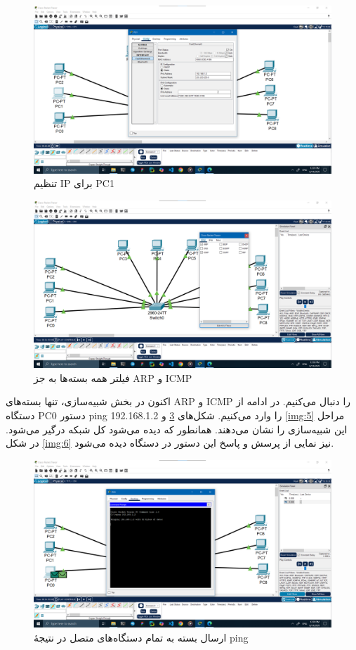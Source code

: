 \documentclass[12pt]{article}
\begin{document}
	\begin{figure}[H]
		\centering
		\includegraphics[width=\textwidth]{resources/2-1.png}
		\caption{تنظیم \textenglish{IP} برای \textenglish{PC1}}
		\label{img:2-1}
	\end{figure}
	\begin{figure}[H]
		\centering
		\includegraphics[width=\textwidth]{resources/3.png}
		\caption{فیلتر همه بسته‌ها به جز \textenglish{ARP} و \textenglish{ICMP}}
		\label{img:3}
	\end{figure}
	اکنون در بخش شبیه‌سازی، تنها بسته‌های \textenglish{ARP} و \textenglish{ICMP} را دنبال می‌کنیم. در ادامه از دستگاه \textenglish{PC0} دستور \textenglish{ping 192.168.1.2} را وارد می‌کنیم. شکل‌های \ref{img:4} و \ref{img:5} مراحل این شبیه‌سازی را نشان می‌دهند. همانطور که دیده می‌شود کل شبکه درگیر می‌شود. در شکل \ref{img:6} نیز نمایی از پرسش و پاسخ این دستور در دستگاه دیده می‌شود.
	\begin{figure}[H]
		\centering
		\includegraphics[width=\textwidth]{resources/4.png}
		\caption{ارسال بسته به تمام دستگاه‌‌های متصل در نتیجهٔ \textenglish{ping}}
		\label{img:4}
	\end{figure}
\end{document}
